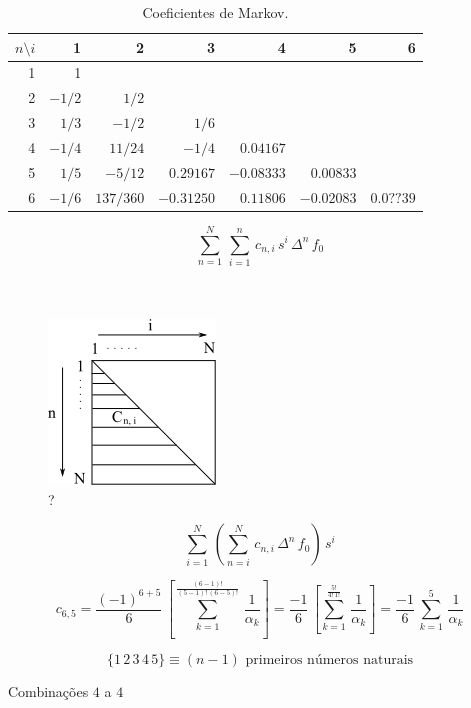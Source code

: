 \begin{itemize}
\begin{itemize}
\begin{table}[htp]
	\centering
		\begin{tabular}{|r||r|r|r|r|r|r|}
		\hline		
		\textbf{$ n \setminus i $} & 1 & 2 & 3 & 4 & 5 & 6\\
		\hline \hline 
		1 & 1 & & & & &\\
		\hline 
		2 & $ -1/2 $ & $ 1/2 $ & & & &\\
		\hline 
		3 & $ 1/3 $ & $ -1/2 $ & $ 1/6 $ & & &\\
		\hline 
		4 & $ -1/4 $ & $ 11/24 $ & $ -1/4 $ & $ 0.04167 $ & &\\
		\hline 
		5 & $ 1/5 $ & $ -5/12 $ & $ 0.29167 $ & $ -0.08333 $ & $ 0.00833 $ &\\
		\hline 
		6 & $ -1/6 $ & $ 137/360 $ & $ -0.31250 $ & $ 0.11806 $ & $ -0.02083 $ & $ 0.0??39 $\\
		\hline
		\end{tabular}
	\caption{Coeficientes de Markov.}
	\label{cap5:sec2:tab1}
\end{table}

\[
 \sum_{n=1}^N \, \sum_{i=1}^n \, c_{n,i} \, s^i \, \Delta^n \, f_0
\]\\ \\

\begin{figure}[htb]
 \centering
 \includegraphics[scale=0.8]{capitulos/capitulo5/figuras/met_inter2.png}
 \caption{?}
 \label{fig:met_inter2}
\end{figure}

\[
 \sum_{i=1}^N \, \left( \sum_{n=i}^N \, c_{n,i} \, \Delta^n \, f_0 \right) \, s^i
\]

\[
 c_{6,5}
 = \frac{(-1)^{6+5}}{6} \, \left[ \sum_{k=1}^{\frac{(6-1)!}{(5-1)! \, (6-5)!}} \, \frac{1}{\alpha_k} \right]
 = \frac{-1}{6} \, \left[ \sum_{k=1}^{\frac{5!}{4! \, 1!}} \, \frac{1}{\alpha_k} \right]
 = \frac{-1}{6} \, \sum_{k=1}^5 \, \frac{1}{\alpha_k}
\]

\[
 \{1 \, 2 \, 3 \, 4 \, 5\} \equiv (n-1) \mbox{ primeiros números naturais}
\]

Combinações $ 4 $ a $ 4 $


\end{itemize}
\end{itemize}
